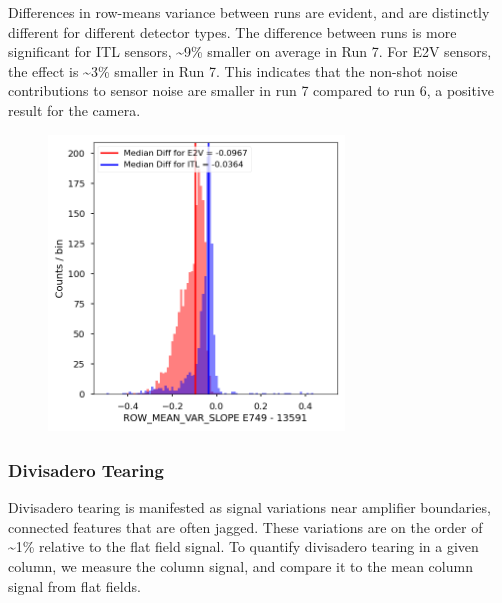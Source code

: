 Differences in row-means variance between runs are evident, and are distinctly different for different detector types. The difference between runs is more significant for ITL sensors, \textasciitilde9\% smaller on average in Run 7. For E2V sensors, the effect is \textasciitilde3\% smaller in Run 7. This indicates that the non-shot noise contributions to sensor noise are smaller in run 7 compared to run 6, a positive result for the camera.

\begin{figure}[H]
\begin{centering}
\includegraphics[width=0.7\textwidth]{sections/figures/baselineCharacterization/ROW_MEAN_VAR_SLOPE_13591_E749_diff.png}
\end{centering}
\end{figure}

\subsubsection{Divisadero Tearing}\label{divisadero-tearing}

Divisadero tearing is manifested as signal variations near amplifier boundaries, connected features that are often jagged. These variations are on the order of \textasciitilde1\% relative to the flat field signal. To quantify divisadero tearing in a given column, we measure the column signal, and compare it to the mean column signal from flat fields.

